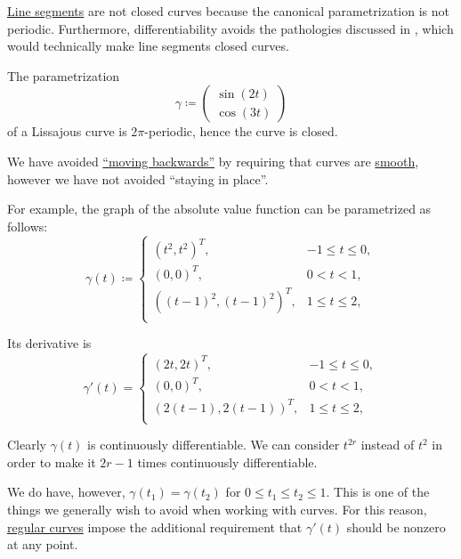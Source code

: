 \begin{example}\label{ex:def:closed_curve}
  \hfill
  \begin{thmenum}
     \hyperref[def:line_segment]{Line segments} are not closed curves because the canonical parametrization is not periodic. Furthermore, differentiability avoids the pathologies discussed in , which would technically make line segments closed curves.

     The parametrization
    \begin{equation*}
      \gamma \coloneqq \begin{pmatrix} \sin(2t) \\ \cos(3t) \end{pmatrix}
    \end{equation*}
    of a Lissajous curve is \( 2\pi \)-periodic, hence the curve is closed.
  \end{thmenum}
\end{example}

\begin{example}\label{ex:curve_staying_in_place}
  We have avoided \hyperref[ex:curve_moving_backwards]{\enquote{moving backwards}} by requiring that curves are \hyperref[def:smooth_curve]{smooth}, however we have not avoided \enquote{staying in place}.

  For example, the graph of the absolute value function can be parametrized as follows:
  \begin{equation*}
    \gamma(t) \coloneqq \begin{cases}
      ( t^2     , t^2 )^T,     &-1 \leq t \leq 0, \\
      ( 0       , 0 )^T,       &0 < t < 1, \\
      ( (t-1)^2 , (t-1)^2 )^T, &1 \leq t \leq 2, \\
    \end{cases}
  \end{equation*}

  Its derivative is
  \begin{equation*}
    \gamma'(t) = \begin{cases}
      ( 2t     , 2t )^T,     &-1 \leq t \leq 0, \\
      ( 0      , 0 )^T,      &0 < t < 1, \\
      ( 2(t-1) , 2(t-1) )^T, &1 \leq t \leq 2, \\
    \end{cases}
  \end{equation*}

  Clearly \( \gamma(t) \) is continuously differentiable. We can consider \( t^{2r} \) instead of \( t^2 \) in order to make it \( 2r - 1 \) times continuously differentiable.

  We do have, however, \( \gamma(t_1) = \gamma(t_2) \) for \( 0 \leq t_1 \leq t_2 \leq 1 \). This is one of the things we generally wish to avoid when working with curves. For this reason, \hyperref[def:regular_curve]{regular curves} impose the additional requirement that \( \gamma'(t) \) should be nonzero at any point.
\end{example}

